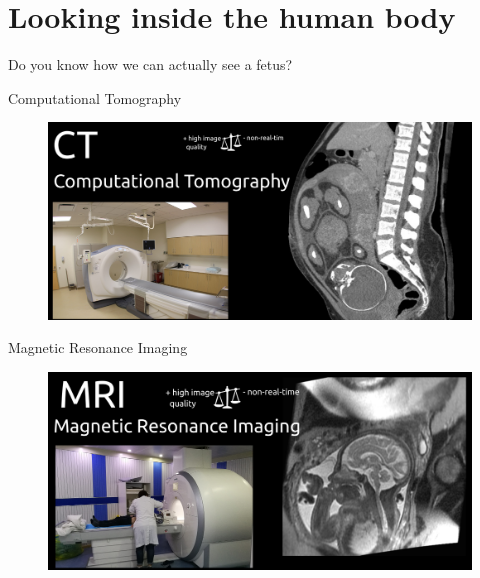 \section{Looking inside the human body}




{
\begin{frame}{}

\BigSizeFont
Do you know how we can actually see a fetus?

\end{frame}
}


{
\begin{frame}{Computational Tomography}
      \begin{figure}
        \centering
        \includegraphics[width=1.0\textwidth]{./figures/medical-imaging-in-pregnancy/ct/versions/drawing-v00.png}
      \end{figure}
\end{frame}
}


{
\begin{frame}{Magnetic Resonance Imaging}
      \begin{figure}
        \centering
        \includegraphics[width=1.0\textwidth]{./figures/medical-imaging-in-pregnancy/mri/versions/drawing-v00.png}
      \end{figure}
\end{frame}
}


